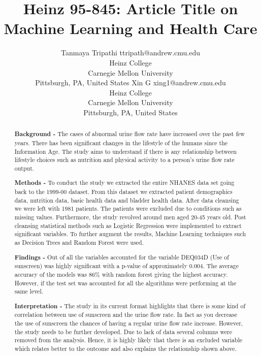\documentclass[twoside,11pt]{article}
\begin{document}
\title{Heinz 95-845: Article Title on \\Machine Learning and Health Care}

\author{\name Tanmaya Tripathi \email ttripath@andrew.cmu.edu \\
       \addr Heinz College\\
       Carnegie Mellon University\\
       Pittsburgh, PA, United States
       \AND
       \name Xin G \email xing1@andrew.cmu.edu \\
       \addr Heinz College\\
       Carnegie Mellon University\\
       Pittsburgh, PA, United States} 

\maketitle

\begin{abstract}
 
 \textbf{Background -} The cases of abnormal urine flow rate have increased over the past few years. There has been significant changes in the lifestyle of the humans since the Information Age. The study aims to understand if there is any relationship between lifestyle choices such as nutrition and physical activity to a person's urine flow rate output.


\vspace{5mm}  \textbf{Methods - } To conduct the study we extracted the entire NHANES data set going back to the 1999-00 dataset. From this dataset we extracted patient demographics data, nutrition data, basic health data and bladder health data. After data cleansing we were left with 1981 patients. The patients were excluded due to conditions such as missing values. Furthermore, the study revolved around men aged 20-45 years old. Post cleansing statistical methods such as Logistic Regression were implemented to extract significant variables. To further augment the results, Machine Learning techniques such as Decision Trees and Random Forest were used.


\vspace{5mm} \textbf{Findings - } Out of all the variables accounted for the variable DEQ034D (Use of sunscreen) was highly significant with a p-value of approximately 0.004. The average accuracy of the models was 86\% with random forest giving the highest accuracy. However, if the test set was accounted for all the algorithms were performing at the same level.


\vspace{5mm} \textbf{Interpretation - } The study in its current format highlights that there is some kind of correlation between use of sunscreen and the urine flow rate. In fact as you decrease the use of sunscreen the chances of having a regular urine flow rate increase. However, the study needs to be further developed. Due to lack of data several columns were removed from the analysis. Hence, it is highly likely that there is an excluded variable which relates better to the outcome and also explains the relationship shown above.
\end{abstract}
\end{document}
